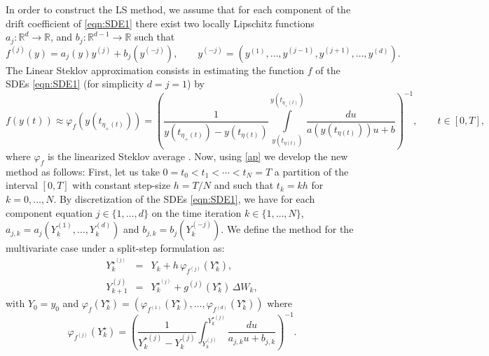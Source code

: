 
\newcommand{\BigFig}[1]{\parbox{12pt}{\Huge #1}}
\newcommand{\BigZero}{\BigFig{0}}
%
In order to construct the LS method, we assume that  for each component of the drift coefficient of \eqref{eqn:SDE1} there exist 
two locally Lipschitz functions $a_j:\mathbb{R}^{d} \to \mathbb{R}$, and
		$b_{j}:\mathbb{R}^{d-1} \to \mathbb{R}$ such that 
		\begin{equation}\label{eqn:AlternativeConstruction}
		f^{(j)}(y) = a_j (y) y^{(j)} + b_{j}(y^{(-j)}), \qquad
		y^{(-j)} = (y^{(1)}, \dots ,y^{(j-1)}, y^{(j+1)}, \dots, y^{(d)}).
		\end{equation}
The Linear Steklov approximation consists in estimating the function $f$ of 
	the SDEs \eqref{eqn:SDE1} (for simplicity $d=j=1$) by 
\begin{equation} \label{ap}
	f(y(t)) \approx 
		\varphi_{f}(y(t_{\eta_{+}(t)})) =
		\left(
			\frac{1}{y(t_{\eta_+(t)})-y(t_{\eta (t)})}
			\int \limits
_				{y(t_{\eta(t)})}^{y(t_{\eta_+(t)})}
					\frac{du}
						{
							a(y(t_{\eta(t)}))u
							+b
						}
	\right)^{-1}, \qquad t\in [0,T],
\end{equation}
where  $\varphi_f$ 
is the linearized Steklov average \cite{Diaz-Infante2015}. 
Now, using \eqref{ap} we develop the new  method as follows: 
First, let us take  $0=t_0 < t_1< \cdots < t_N=T$ a partition of the interval $[0,T]$ with 
constant step-size $h=T/N$ and such that $t_k=kh$ for $k=0,\ldots, N$.  By discretization
of the SDEs \eqref{eqn:SDE1}, we have for  each component equation $j\in\{1, \ldots,  d\}$ 
	on  the time iteration  $k\in\{1, \ldots,  N\}$, 
	$a_{j,k} =a_j
	\left(
		Y^{(1)}_{k},
		\ldots, Y^{(d)}_{k}
	\right)$  and $b_{j,k} =
	b_{j}
	\left(
			Y^{(-j)}_k
	\right)$. We define the \SM method for 
	the multivariate case under 
a split-step  formulation as:
\begin{eqnarray}
 	Y_{k}^{{\star}^{(j)}} &=& Y_k + h\, \varphi_{f^{(j)}}(Y^{\star}_k), \label{eqn:SSLSM1}\\
	Y_{k+1}^{(j)}	&=& Y_k^{{\star}^{(j)}} + g^{(j)}(Y_k^{\star})\, \Delta W_k 
	\label{eqn:SSLSM2},
\end{eqnarray}
with $Y_0=y_0$ and  $	\varphi_{f}(Y_k^{\star})=
		\left(
			\varphi_{f^{(1)}}(Y_k^{\star}),
			\ldots,
			\varphi_{f^{(d)}}(Y_k^{\star})
		\right)$
where
\begin{equation}\label{fi}
	\varphi_{f^{(j)}}\left(Y_k^{\star}\right)
		=
		\left(
			\frac{1}{Y_{k}^{\star(j)}-Y_{k}^{(j)}}
			\int 
				_{Y_{k}^{(j)}}^{Y_{k}^{\star(j)}}
				\frac{du}
				{
					a_{j,k} u
					+b_{j,k}
				}
		\right)^{-1}.
\end{equation}	
